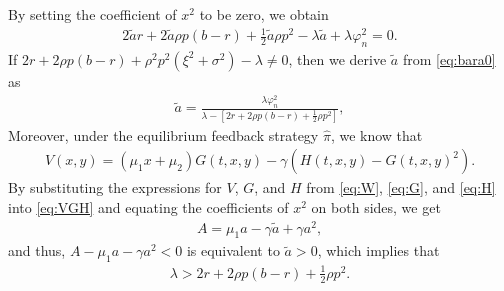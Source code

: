 \documentclass[11pt]{article}
\newcommand \ba {\tilde{a}}
\numberwithin{equation}{section}
\begin{document}
	By setting the coefficient of \(x^2\) to be zero, we obtain
	\begin{align}\label{eq:bara0}
		2 \tilde{a} r+2 \tilde{a}\rho p(b-r)+\frac{1}{2} \tilde{a}\rho p^2 -\lambda  \tilde{a}+\lambda \varphi_n^2=0.
	\end{align}
	If \(2r + 2\rho p(b - r) + \rho^2 p^2(\xi^2 + \sigma^2) - \lambda \neq 0\), then we derive $\ba$ from \eqref{eq:bara0} as
	\begin{align}\label{eq:bara}
		 \tilde{a}=\frac{\lambda \varphi_n^2}{\lambda-[2r+2\rho p(b-r)+\frac{1}{2}\rho p^2]},
	\end{align}
	Moreover, under the equilibrium feedback strategy \(\widehat{\pi}\), we know that
	\begin{align}\label{eq:VGH}
		V(x,y) = (\mu_1 x + \mu_2) G(t,x,y) - \gamma (H(t,x,y) - G(t,x,y)^2).
	\end{align}
	By substituting the expressions for \(V\), \(G\), and \(H\) from \eqref{eq:W}, \eqref{eq:G}, and \eqref{eq:H} into \eqref{eq:VGH} and equating the coefficients of $x^2$ on both sides, we get
	\begin{align}
		A = \mu_1 a - \gamma  \tilde{a} + \gamma a^2,
		\label{eq:A}
	\end{align}
	and thus, \(A - \mu_1 a - \gamma a^2 < 0\) is equivalent to \( \tilde{a} > 0\), which implies that
	\begin{align}\label{eq:conditionP}
		\lambda>2r+2\rho p(b-r)+\frac{1}{2}\rho p^2.
	\end{align}
	
\end{document}
